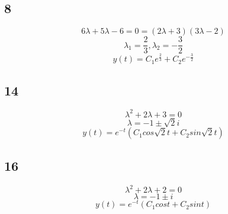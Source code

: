 \documentclass[12pt, a4paper]{IEEEtran}
\begin{document}
    \subsection*{8}
    $$6\lambda+5\lambda-6=0=(2\lambda+3)(3\lambda-2)$$
    $$\lambda_1=\frac{2}{3}, \lambda_2=-\frac{3}{2}$$
    $$y(t)=C_1e^{\frac{2}{3}}+C_2e^{-\frac{3}{2}}$$

    \subsection*{14}
    $$\lambda^2+2\lambda+3=0$$
    $$\lambda=-1\pm \sqrt{2}i$$
    $$y(t)=e^{-t}(C_1cos\sqrt{2}t+C_2sin\sqrt{2}t)$$

    \subsection*{16}
    $$\lambda^2+2\lambda+2=0$$
    $$\lambda=-1\pm i$$
    $$y(t)=e^{-t}(C_1cost+C_2sint)$$
























    

    
\end{document}

